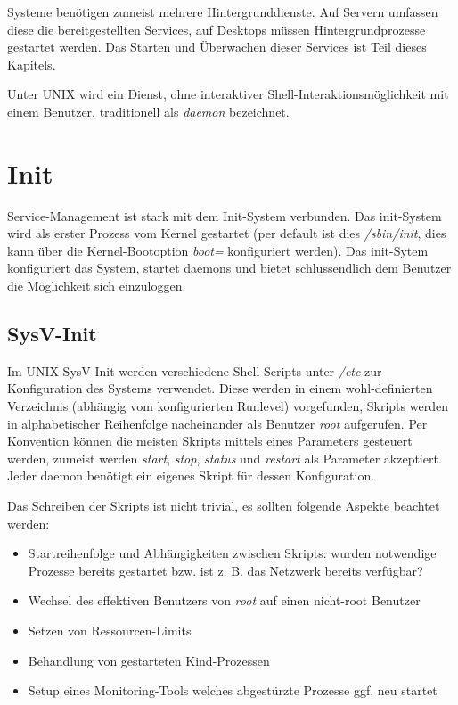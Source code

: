 Systeme benötigen zumeist mehrere Hintergrunddienste. Auf Servern umfassen diese die bereitgestellten Services, auf Desktops müssen Hintergrundprozesse gestartet werden. Das Starten und Überwachen dieser Services ist Teil dieses Kapitels.

Unter UNIX wird ein Dienst, ohne interaktiver Shell-Interaktionsmöglichkeit mit einem Benutzer, traditionell als \textit{daemon} bezeichnet.

\section{Init}

Service-Management ist stark mit dem Init-System verbunden. Das init-System wird als erster Prozess vom Kernel gestartet (per default ist dies \textit{/sbin/init}, dies kann über die Kernel-Bootoption \textit{boot=} konfiguriert werden). Das init-Sytem konfiguriert das System, startet daemons und bietet schlussendlich dem Benutzer die Möglichkeit sich einzuloggen.

\subsection{SysV-Init}

Im UNIX-SysV-Init werden verschiedene Shell-Scripts unter \textit{/etc} zur Konfiguration des Systems verwendet. Diese werden in einem wohl-definierten Verzeichnis (abhängig vom konfigurierten Runlevel) vorgefunden, Skripts werden in alphabetischer Reihenfolge nacheinander als Benutzer \textit{root} aufgerufen. Per Konvention können die meisten Skripts mittels eines Parameters gesteuert werden, zumeist werden \textit{start}, \textit{stop}, \textit{status} und \textit{restart} als Parameter akzeptiert. Jeder daemon benötigt ein eigenes Skript für dessen Konfiguration.

Das Schreiben der Skripts ist nicht trivial, es sollten folgende Aspekte beachtet werden:

\begin{itemize}
	\item Startreihenfolge und Abhängigkeiten zwischen Skripts: wurden notwendige Prozesse bereits gestartet bzw. ist z. B. das Netzwerk bereits verfügbar?
	\item Wechsel des effektiven Benutzers von \textit{root} auf einen nicht-root Benutzer
	\item Setzen von Ressourcen-Limits
	\item Behandlung von gestarteten Kind-Prozessen
	\item Setup eines Monitoring-Tools welches abgestürzte Prozesse ggf. neu startet
\end{itemize}

